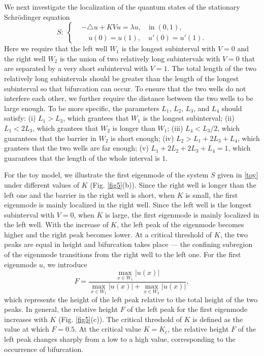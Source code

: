 \documentclass[a4paper,11pt]{article}
\begin{document}
We next investigate the localization of the quantum states of the stationary Schr\"{o}dinger equation
\begin{equation}\label{toy}
S: \;
\left\{
\begin{split}
& -\triangle u + K V u = \lambda u, \quad \textrm{in} \; (0, 1), \\
& \quad u(0) = u(1), \quad u'(0) =  u'(1).
\end{split}
\right.
\end{equation}
Here we require that the left well $W_1$ is the longest subinterval with $V = 0$ and the right well $W_2$ is the union of two relatively long subintervals with $V = 0$ that are separated by a very short subinterval with $V = 1$. The total length of the two relatively long subintervals should be greater than the length of the longest subinterval so that bifurcation can occur. To ensure that the two wells do not interfere each other, we further require the distance between the two wells to be large enough. To be more specific, the parameters $L_1$, $L_2$, $L_3$, and $L_4$ should satisfy: (i) $L_1 > L_3$, which grantees that $W_1$ is the longest subinterval; (ii) $L_1 < 2L_3$, which grantees that $W_2$ is longer than $W_1$; (iii) $L_4 < L_3/2$, which guarantees that the barrier in $W_2$ is short enough; (iv) $L_2 > L_1 + 2L_3 + L_4$, which grantees that the two wells are far enough; (v) $L_1 + 2L_2 + 2 L_3 + L_4 = 1$, which guarantees that the length of the whole interval is $1$.

For the toy model, we illustrate the first eigenmode of the system $S$ given in \eqref{toy} under different values of $K$ (Fig. \ref{fig5}(b)). Since the right well is longer than the left one and the barrier in the right well is short, when $K$ is small, the first eigenmode is mainly localized in the right well. Since the left well is the longest subinterval with $V = 0$, when $K$ is large, the first eigenmode is mainly localized in the left well. With the increase of $K$, the left peak of the eigenmode becomes higher and the right peak becomes lower. At a critical threshold of $K$, the two peaks are equal in height and bifurcation takes place --- the confining subregion of the eigenmode transitions from the right well to the left one. For the first eigenmode $u$, we introduce
\begin{equation}
F = \frac{\max_{x \in W_1} |u(x)|}{\max_{x \in W_1} |u(x)| + \max_{x \in W_2} |u(x)|},
\end{equation}
which represents the height of the left peak relative to the total height of the two peaks. In general, the relative height $F$ of the left peak for the first eigenmode increases with $K$ (Fig. \ref{fig5}(c)). The critical threshold of $K$ is defined as the value at which $F = 0.5$. At the critical value $K = K_c$, the relative height $F$ of the left peak changes sharply from a low to a high value, corresponding to the occurrence of bifurcation.
\end{document}

